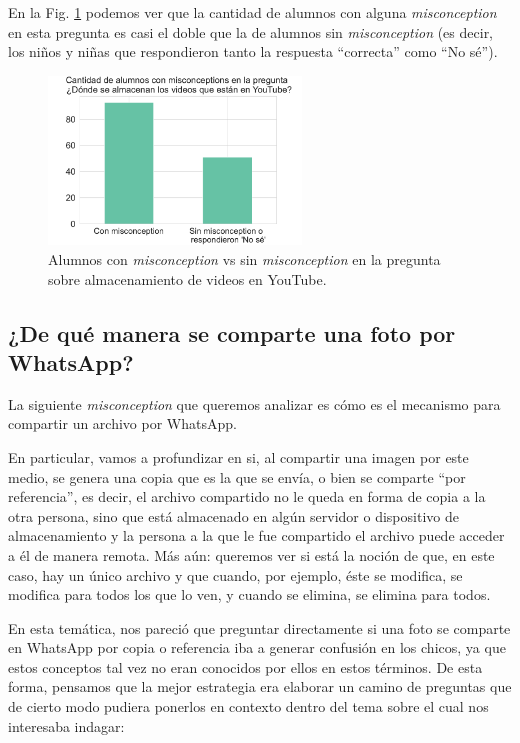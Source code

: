En la Fig. \ref{fig:analisis9} podemos ver que la cantidad de alumnos con alguna \textit{misconception} en esta pregunta es casi el doble que la de alumnos sin \textit{misconception} (es decir, los niños y niñas que respondieron tanto la respuesta ``correcta'' como ``No sé'').

\begin{figure}[h]
    \centering
    \includegraphics[width=0.6\textwidth]{images_analisis/9.pdf}
    \caption{Alumnos con \textit{misconception} vs sin \textit{misconception} en la pregunta sobre almacenamiento de videos en YouTube.}
    \label{fig:analisis9}
\end{figure}

\newpage

\subsection{¿De qué manera se comparte una foto por WhatsApp?}

La siguiente \textit{misconception} que queremos analizar es cómo es el mecanismo para compartir un archivo por WhatsApp.

En particular, vamos a profundizar en si, al compartir una imagen por este medio, se genera una copia que es la que se envía, o bien se comparte ``por referencia'', es decir, el archivo compartido no le queda en forma de copia a la otra persona, sino que está almacenado en algún servidor o dispositivo de almacenamiento y la persona a la que le fue compartido el archivo puede acceder a él de manera remota.  Más aún: queremos ver si está la noción de que, en este caso, hay un único archivo y que cuando, por ejemplo, éste se modifica, se modifica para todos los que lo ven, y cuando se elimina, se elimina para todos. 

En esta temática, nos pareció que preguntar directamente si una foto se comparte en WhatsApp por copia o referencia iba a generar confusión en los chicos, ya que estos conceptos tal vez no eran conocidos por ellos en estos términos.
De esta forma, pensamos que la mejor estrategia era elaborar un camino de preguntas que de cierto modo pudiera ponerlos en contexto dentro del tema sobre el cual nos interesaba indagar:

